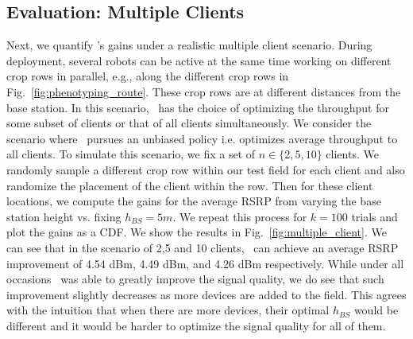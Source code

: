 \subsection{Evaluation: Multiple Clients}

Next, we quantify \name's gains under a realistic multiple client scenario. During deployment, several robots can be active at the same time working on different crop rows in parallel, e.g., along the different crop rows in Fig.~\ref{fig:phenotyping_route}. These crop rows are at different distances from the base station. In this scenario, \name\ has the choice of optimizing the throughput for some subset of clients or that of all clients simultaneously. We consider the scenario where \name\ pursues an unbiased policy i.e. optimizes average throughput to all clients. To simulate this scenario, we fix a set of $n \in \{2,5,10\}$ clients. We randomly sample a different crop row within our test field for each client and also randomize the placement of the client within the row. Then for these client locations, we compute the gains for the average RSRP from varying the base station height vs. fixing $h_{BS}=5m$. We repeat this process for $k = 100$ trials and plot the gains as a CDF. We show the results in Fig.~\ref{fig:multiple_client}. We can see that in the scenario of 2,5 and 10 clients, \name\ can achieve an average RSRP improvement of 4.54 dBm, 4.49 dBm, and 4.26 dBm respectively. While under all occasions \name\ was able to greatly improve the signal quality, we do see that such improvement slightly decreases as more devices are added to the field. This agrees with the intuition that when there are more devices, their optimal $h_{BS}$ would be different and it would be harder to optimize the signal quality for all of them.
